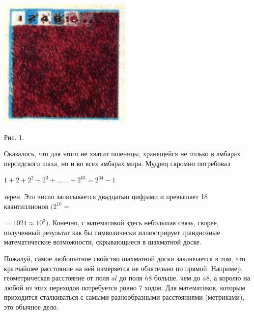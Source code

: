 \begin{multicols}{3}
\begin{flushleft}
    \includegraphics[width=\linewidth]{img1.png}
\end{flushleft}

\begin{flushleft}
Рис. 1.
\end{flushleft} 


Оказалось, что для этого не хватит пшеницы, хранящейся не только в амбарах персидского
шаха, но и во всех амбарах мира. Мудрец скромно потребовал
\begin{flushleft}
\(1 + 2 + 2^{2} + 2^{3} + ...\)
\(.. + 2^{63} = 2^{64} - 1\)
\end{flushleft}
зерен. Это число записывается двадцатью цифрами и превышает 18 квантиллионов \((2^{10}=\)


\columnbreak


\noindent \(=1024 \approx 10^{3})\). Конечно, с математикой здесь небольшая связь,
скорее, полученный результат как бы символически иллюстрирует грандиозные
математические возможности, скрывающиеся в шахматной доске.

Пожалуй, самое любопытное свойство шахматной доски заключается в том, что кратчайшее
расстояние на ней измеряется не обзятельно по прямой. Например, геометрическая расстояние от поля \(al\) до поля \(h8\) больше, чем до \(a8\), а королю на любой
из этих переходов потребуется ровно \(7\) ходов. Для математиков, которым
приходится сталкиваться с самыми разнообразными расстояниями (метриками), это обычное дело.


\end{multicols}
